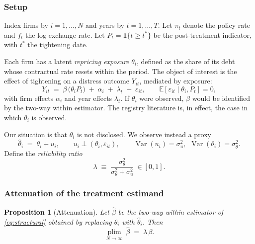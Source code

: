 \documentclass[review,12pt,authoryear]{elsarticle}
\theoremstyle{plain}
\newtheorem{proposition}{Proposition}
\theoremstyle{definition}
\newcommand{\E}{\mathbb{E}}
\newcommand{\Var}{\operatorname{Var}}
\newcommand{\plim}{\operatorname*{plim}}
\newcommand{\one}{\mathbf{1}}
\begin{document}
\subsubsection{Setup}

Index firms by $i=1,\dots,N$ and years by $t=1,\dots,T$. Let $\pi_t$ denote the
policy rate and $f_t$ the log exchange rate. Let $P_t=\one\{t\ge t^{*}\}$ be the
post-treatment indicator, with $t^{*}$ the tightening date.

Each firm has a latent \emph{repricing exposure} $\theta_i$, defined as the
share of its debt whose contractual rate resets within the period. The object of
interest is the effect of tightening on a distress outcome $Y_{it}$, mediated by
exposure:
\begin{equation}
Y_{it} \;=\; \beta\,\bigl(\theta_i P_t\bigr) \;+\; \alpha_i \;+\; \lambda_t
\;+\; \varepsilon_{it},
\qquad \E[\varepsilon_{it}\mid \theta_i, P_t]=0,
\label{eq:structural}
\end{equation}
with firm effects $\alpha_i$ and year effects $\lambda_t$. If $\theta_i$ were
observed, $\beta$ would be identified by the two-way within estimator. The
registry literature is, in effect, the case in which $\theta_i$ is observed.

Our situation is that $\theta_i$ is not disclosed. We observe instead a proxy
\begin{equation}
\widehat{\theta}_i \;=\; \theta_i + u_i,
\qquad u_i \perp (\theta_i,\varepsilon_{it}),
\qquad \Var(u_i)=\sigma_u^2,\ \ \Var(\theta_i)=\sigma_\theta^2 .
\label{eq:proxy}
\end{equation}
Define the \emph{reliability ratio}
\begin{equation}
\lambda \;\equiv\; \frac{\sigma_\theta^2}{\sigma_\theta^2+\sigma_u^2}\ \in[0,1].
\label{eq:lambda}
\end{equation}

\subsubsection{Attenuation of the treatment estimand}

\begin{proposition}[Attenuation]
\label{prop:atten}
Let $\widehat{\beta}$ be the two-way within estimator of \eqref{eq:structural}
obtained by replacing $\theta_i$ with $\widehat{\theta}_i$. Then
\begin{equation}
\plim_{N\to\infty}\ \widehat{\beta} \;=\; \lambda\,\beta .
\end{equation}
\end{proposition}
\end{document}
